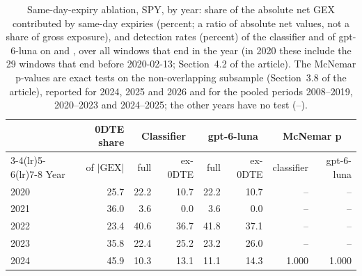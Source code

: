 \begin{table}[H]
\centering
\caption{Same-day-expiry ablation, SPY, by year: share of the absolute net GEX contributed by same-day expiries (percent; a ratio of absolute net values, not a share of gross exposure), and detection rates (percent) of the classifier and of gpt-6-luna on  and , over all windows that end in the year (in 2020 these include the 29 windows that end before 2020-02-13; Section~4.2 of the article). The McNemar p-values are exact tests on the non-overlapping subsample (Section~3.8 of the article), reported for 2024, 2025 and 2026 and for the pooled periods 2008--2019, 2020--2023 and 2024--2025; the other years have no test (--).}
\label{tab:ablation}
\footnotesize
\begin{tabular}{@{}lrrrrrrr@{}}
\toprule
 & 0DTE share & \multicolumn{2}{c}{Classifier} & \multicolumn{2}{c}{gpt-6-luna} & \multicolumn{2}{c}{McNemar p} \\
\cmidrule(lr){3-4}\cmidrule(lr){5-6}\cmidrule(lr){7-8}
Year & of $|\mathrm{GEX}|$ & full & ex-0DTE & full & ex-0DTE & classifier & gpt-6-luna \\
\midrule
2020 & 25.7 & 22.2 & 10.7 & 22.2 & 10.7 & -- & -- \\
2021 & 36.0 & 3.6 & 0.0 & 3.6 & 0.0 & -- & -- \\
2022 & 23.4 & 40.6 & 36.7 & 41.8 & 37.1 & -- & -- \\
2023 & 35.8 & 22.4 & 25.2 & 23.2 & 26.0 & -- & -- \\
2024 & 45.9 & 10.3 & 13.1 & 11.1 & 14.3 & 1.000 & 1.000 \\

\end{tabular}
\end{table}
